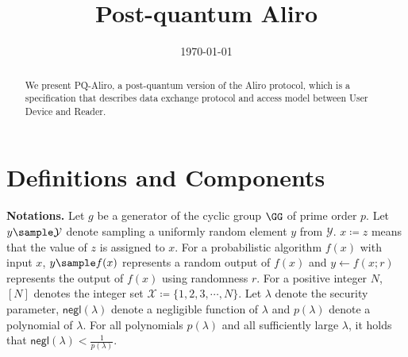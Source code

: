 \documentclass[a4paper,11pt]{article}
\newcommand{\negli}{\mathsf{negl}}
\newcommand{\SEC}{\lambda}
\begin{document}
\begin{sloppypar}


\begingroup
\let\newpage\relax
\title{Post-quantum Aliro
}

\author{
}

\date{\today}

\maketitle
 \endgroup
 
\thispagestyle{empty}


\begin{abstract}
We present PQ-Aliro, a post-quantum version of the Aliro protocol, which is a specification that describes data exchange protocol and 
access model between User Device and Reader.
\end{abstract}


\newpage

\pagestyle{plain}
\setcounter{page}{1}


\section{Definitions and Components}
\label{definition 1}
\noindent\textbf{Notations.}
Let $g$ be a generator of the cyclic group $\GG$ of prime order $p$.
Let $y\sample \mathcal{Y}$ denote sampling a uniformly random element $y$ from $\mathcal{Y}$.
$x\coloneqq z$ means that the value of $z$ is assigned to $x$.
For a probabilistic algorithm $f(x)$ with input $x$, $y\sample f(x)$ represents a random output of $f(x)$ and $y\gets f(x;r)$ represents the output of $f(x)$ using randomness $r$.
For a positive integer $N$, $[N]$ denotes the integer set $\mathcal{X} \coloneqq \{1, 2, 3,\cdots, N\}$.
Let $\SEC$ denote the security parameter, $\negli(\lambda)$ denote a negligible function of $\SEC$ and $p(\SEC)$ denote a polynomial of $\SEC$.
For all polynomials $p(\lambda)$ and all sufficiently large $\lambda$, it holds that $\negli(\lambda) < \frac{1}{p(\lambda)}$.


\end{sloppypar}
\end{document}
